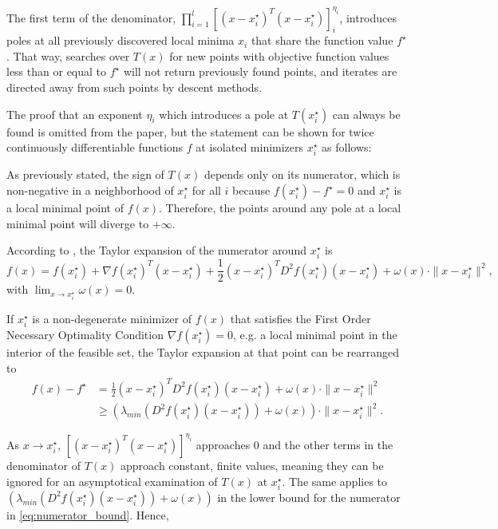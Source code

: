 \documentclass[a4paper,12pt,twoside]{article}
\begin{document}
The first term of the denominator, $\prod_{i = 1}^l [(x - x^\star_i)^T(x - x^\star_i)]^{\eta_i}_i$, introduces poles at all previously discovered local minima $x_i$ that share the function value $f^\star$. That way, searches over $T(x)$ for new points with objective function values less than or equal to $f^\star$ will not return previously found points, and iterates are directed away from such points by descent methods.

The proof that an exponent $\eta_i$ which introduces a pole at $T(x_i^\star)$ can always be found is omitted from the paper, but the statement can be shown for twice continuously differentiable functions $f$ at isolated minimizers $x_i^\star$ as follows:

As previously stated, the sign of $T(x)$ depends only on its numerator, which is non-negative in a neighborhood of $x_i^\star$ for all $i$ because $f(x_i^\star) - f^\star = 0$ and $x_i^\star$ is a local minimal point of $f(x)$. Therefore, the points around any pole at a local minimal point will diverge to $+\infty$.


According to \cite[Th. 2.1.30]{stein_basic_2024} , the Taylor expansion of the numerator around $x_i^\star$ is 
\[
f(x) = f(x_i^\star) + \nabla f(x_i^\star)^T(x-x_i^\star) + \frac{1}{2}(x-x_i^\star)^T D^2f(x_i^\star)(x-x_i^\star) + \omega(x) \cdot \|x-x_i^\star\|^2,
\]
with $\lim_{x \to x^\star_i}\omega(x) =0$.

If $x_i^ \star$ is a non-degenerate minimizer of $f(x)$ that satisfies the First Order Necessary Optimality Condition $\nabla f(x_i^\star) = 0$, e.g. a local minimal point in the interior of the feasible set, the Taylor expansion at that point can be rearranged to 
\begin{align}
f(x) - f^\star &=  \frac{1}{2} (x-x_i^\star)^T D^2f(x_i^\star)(x-x_i^\star) + \omega(x) \cdot \|x-x_i^\star\|^2  \nonumber \\ 
&\geq (\lambda_{min}(D^2f(x_i^\star)(x-x_i^\star)) + \omega(x)) \cdot \|x-x_i^\star\|^2. \label{eq:numerator_bound}
\end{align}

As $x \to x_i^\star$, $[(x-x_i^\star)^T(x-x_i^\star)]^{\eta_i}$ approaches $0$ and the other terms in the denominator of $T(x)$ approach constant, finite values, meaning they can be ignored for an asymptotical examination of $T(x)$ at $x_i^\star$. The same applies to $(\lambda_{min}(D^2 f(x_i^\star)(x-x_i^\star)) + \omega(x))$ in the lower bound for the numerator in \ref{eq:numerator_bound}. Hence, 
\end{document}
